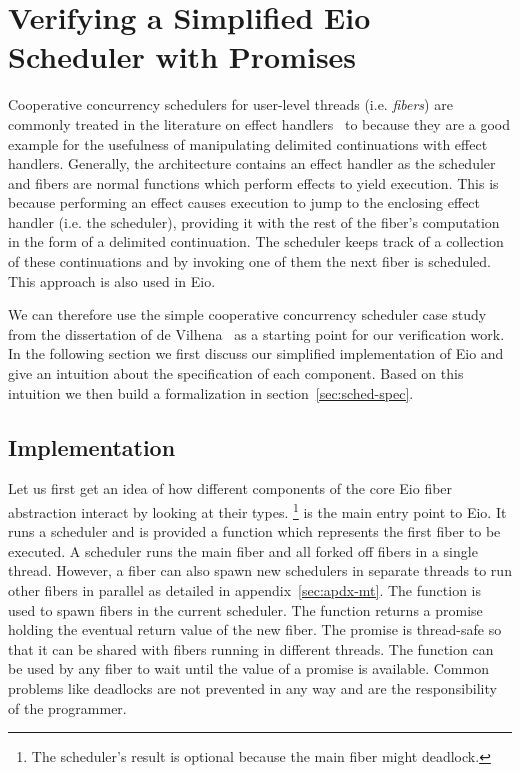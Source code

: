 \section{Verifying a Simplified Eio Scheduler with Promises}
\label{sec:scheduler}


Cooperative concurrency schedulers for user-level threads (i.e. \emph{fibers}) are commonly treated in the literature
on effect handlers~\cite{dolan2018concurrent,leijen2017structured,de2021separation} to because they are a good example for the usefulness
of manipulating delimited continuations with effect handlers.
Generally, the architecture contains an effect handler as the scheduler and fibers are normal functions which perform effects to yield execution.
This is because performing an effect causes execution to jump to the enclosing effect handler (i.e. the scheduler), providing it with the rest of the fiber's computation in the form of a delimited continuation.
The scheduler keeps track of a collection of these continuations and by invoking one of them the next fiber is scheduled.
This approach is also used in Eio.

We can therefore use the simple cooperative concurrency scheduler case study from the dissertation of de Vilhena~\cite{de2022proof} as a starting point for our verification work.
In the following section we first discuss our simplified implementation of Eio and give an intuition about the specification of each component.
Based on this intuition we then build a formalization in section~\ref{sec:sched-spec}.

\subsection{Implementation}
\label{sec:sched-impl}

Let us first get an idea of how different components of the core Eio fiber abstraction interact by looking at their types.
\footnote{The scheduler's result is optional because the main fiber might deadlock.} is the main entry point to Eio.
It runs a scheduler and is provided a function which represents the first fiber to be executed.
A scheduler runs the main fiber and all forked off fibers in a single thread.
However, a fiber can also spawn new schedulers in separate threads to run other fibers in parallel as detailed in appendix~\ref{sec:apdx-mt}.
The  function is used to spawn fibers in the current scheduler.
The function returns a promise holding the eventual return value of the new fiber.
The promise is thread-safe so that it can be shared with fibers running in different threads.
The  function can be used by any fiber to wait until the value of a promise is available.
Common problems like deadlocks are not prevented in any way and are the responsibility of the programmer.

